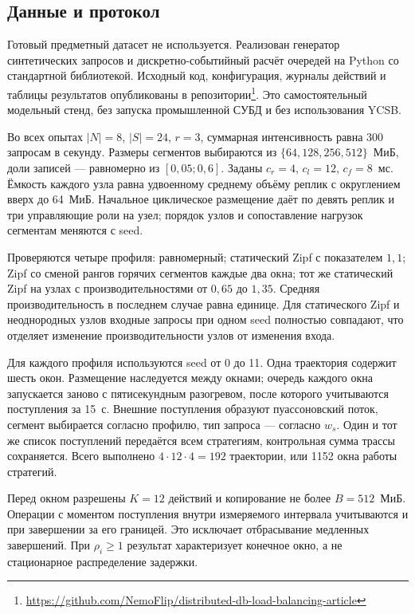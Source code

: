 \documentclass{misisarticle}
\begin{document}
\subsection{Данные и протокол}
Готовый предметный датасет не используется. Реализован генератор синтетических запросов и дискретно-событийный расчёт очередей на Python со стандартной библиотекой. Исходный код, конфигурация, журналы действий и таблицы результатов опубликованы в репозитории\footnote{\url{https://github.com/NemoFlip/distributed-db-load-balancing-article}}. Это самостоятельный модельный стенд, без запуска промышленной СУБД и без использования YCSB.

Во всех опытах $|N|=8$, $|S|=24$, $r=3$, суммарная интенсивность равна 300 запросам в секунду. Размеры сегментов выбираются из $\{64,128,256,512\}$~МиБ, доли записей --- равномерно из $[0{,}05;0{,}6]$. Заданы $c_r=4$, $c_l=12$, $c_f=8$~мс. Ёмкость каждого узла равна удвоенному среднему объёму реплик с округлением вверх до 64~МиБ. Начальное циклическое размещение даёт по девять реплик и три управляющие роли на узел; порядок узлов и сопоставление нагрузок сегментам меняются с seed.

Проверяются четыре профиля: равномерный; статический Zipf с показателем $1{,}1$; Zipf со сменой рангов горячих сегментов каждые два окна; тот же статический Zipf на узлах с производительностями от $0{,}65$ до $1{,}35$. Средняя производительность в последнем случае равна единице. Для статического Zipf и неоднородных узлов входные запросы при одном seed полностью совпадают, что отделяет изменение производительности узлов от изменения входа.

Для каждого профиля используются seed от 0 до 11. Одна траектория содержит шесть окон. Размещение наследуется между окнами; очередь каждого окна запускается заново с пятисекундным разогревом, после которого учитываются поступления за 15~с. Внешние поступления образуют пуассоновский поток, сегмент выбирается согласно профилю, тип запроса --- согласно $w_s$. Один и тот же список поступлений передаётся всем стратегиям, контрольная сумма трассы сохраняется. Всего выполнено $4\cdot12\cdot4=192$ траектории, или 1152 окна работы стратегий.

Перед окном разрешены $K=12$ действий и копирование не более $B=512$~МиБ. Операции с моментом поступления внутри измеряемого интервала учитываются и при завершении за его границей. Это исключает отбрасывание медленных завершений. При $\rho_i\ge1$ результат характеризует конечное окно, а не стационарное распределение задержки.
\end{document}
